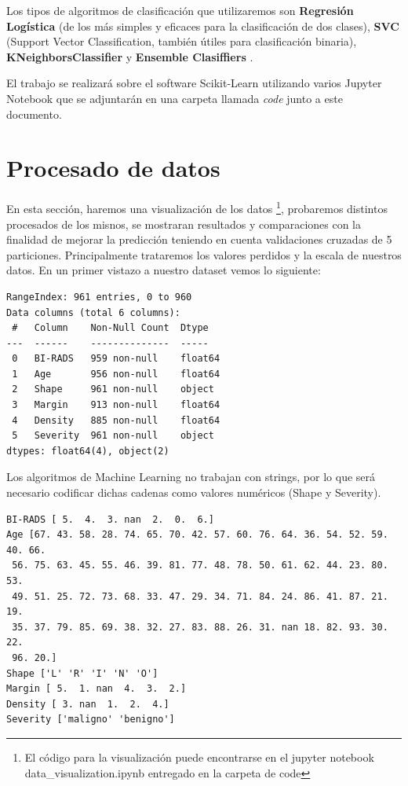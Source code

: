 \documentclass[12pt,twoside]{report}
\begin{document}
Los tipos de algoritmos de clasificación que utilizaremos son \textbf{Regresión Logística} (de los más simples y eficaces para la clasificación de dos clases), \textbf{SVC} (Support Vector Classification, también útiles para clasificación binaria), \textbf{KNeighborsClassifier} y \textbf{Ensemble Clasiffiers} \cite{estimator-choice}. 

El trabajo se realizará sobre el software Scikit-Learn utilizando varios Jupyter Notebook que se adjuntarán en una carpeta llamada \textit{code} junto a este documento.

\chapter*{Procesado de datos}

En esta sección, haremos una visualización de los datos \footnote{El código para la visualización puede encontrarse en el jupyter notebook data\_visualization.ipynb entregado en la carpeta de code}, probaremos distintos procesados de los misnos, se mostraran resultados y comparaciones con la finalidad de mejorar la predicción teniendo en cuenta validaciones cruzadas de 5 particiones. Principalmente trataremos los valores perdidos y la escala de nuestros datos. En un primer vistazo a nuestro dataset vemos lo siguiente:
\begin{multicols}{2}
\begin{lstlisting}
RangeIndex: 961 entries, 0 to 960
Data columns (total 6 columns):
 #   Column    Non-Null Count  Dtype  
---  ------    --------------  -----  
 0   BI-RADS   959 non-null    float64
 1   Age       956 non-null    float64
 2   Shape     961 non-null    object 
 3   Margin    913 non-null    float64
 4   Density   885 non-null    float64
 5   Severity  961 non-null    object 
dtypes: float64(4), object(2)
\end{lstlisting}
Los algoritmos de Machine Learning no trabajan con strings, por lo que será necesario codificar dichas cadenas como valores numéricos (Shape y Severity).
\columnbreak
\begin{lstlisting}
BI-RADS [ 5.  4.  3. nan  2.  0.  6.]
Age [67. 43. 58. 28. 74. 65. 70. 42. 57. 60. 76. 64. 36. 54. 52. 59. 40. 66.
 56. 75. 63. 45. 55. 46. 39. 81. 77. 48. 78. 50. 61. 62. 44. 23. 80. 53.
 49. 51. 25. 72. 73. 68. 33. 47. 29. 34. 71. 84. 24. 86. 41. 87. 21. 19.
 35. 37. 79. 85. 69. 38. 32. 27. 83. 88. 26. 31. nan 18. 82. 93. 30. 22.
 96. 20.]
Shape ['L' 'R' 'I' 'N' 'O']
Margin [ 5.  1. nan  4.  3.  2.]
Density [ 3. nan  1.  2.  4.]
Severity ['maligno' 'benigno']
\end{lstlisting}
\end{multicols}
\end{document}
